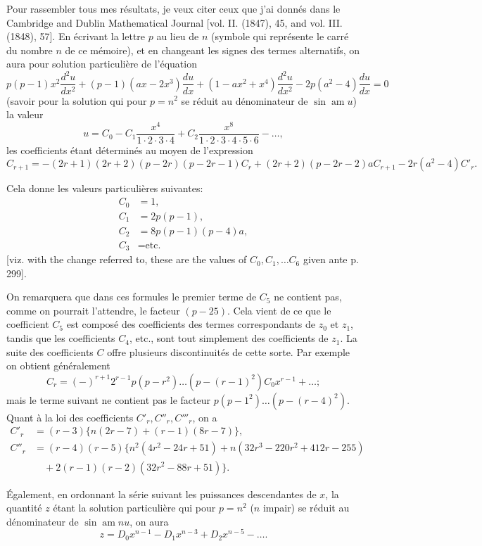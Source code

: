 \documentclass[11pt,a4paper]{book}
\begin{document}
Pour rassembler tous mes r\'{e}sultats, je veux citer ceux que j'ai donn\'{e}s dans le Cambridge and Dublin Mathematical Journal [vol. II. (1847), 45, and vol. III. (1848), 57]. En \'{e}crivant la lettre $p$ au lieu de $n$ (symbole qui repr\'{e}sente le carr\'{e} du nombre $n$ de ce m\'{e}moire), et en changeant les signes des termes alternatifs, on aura pour solution particuli\`{e}re de l'\'{e}quation
\[
p(p-1)x^2 \frac{d^2 u}{dx^2} + (p-1)(ax - 2x^3)\frac{du}{dx} + (1 - ax^2 + x^4)\frac{d^2 u}{dx^2} - 2p(a^2 - 4)\frac{du}{dx} = 0
\]
(savoir pour la solution qui pour $p = n^2$ se r\'{e}duit au d\'{e}nominateur de $\sin \operatorname{am} u$) la valeur
\[
u = C_0 - C_1 \frac{x^4}{1 \cdot 2 \cdot 3 \cdot 4} + C_2 \frac{x^8}{1 \cdot 2 \cdot 3 \cdot 4 \cdot 5 \cdot 6} - \ldots,
\]
les coefficients \'{e}tant d\'{e}termin\'{e}s au moyen de l'expression
\[
C_{r+1} = -(2r+1)(2r+2)(p-2r)(p-2r-1)C_r + (2r+2)(p-2r-2)aC_{r+1} - 2r(a^2-4)C'_r.
\]

Cela donne les valeurs particuli\`{e}res suivantes:
\begin{align*}
C_0 &= 1, \\
C_1 &= 2p(p-1), \\
C_2 &= 8p(p-1)(p-4)a, \\
C_3 &= \text{etc.}
\end{align*}
[viz. with the change referred to, these are the values of $C_0, C_1, \ldots C_6$ given ante p. 299].

On remarquera que dans ces formules le premier terme de $C_5$ ne contient pas, comme on pourrait l'attendre, le facteur $(p-25)$. Cela vient de ce que le coefficient $C_5$ est compos\'{e} des coefficients des termes correspondants de $z_0$ et $z_1$, tandis que les coefficients $C_4$, etc., sont tout simplement des coefficients de $z_1$. La suite des coefficients $C$ offre plusieurs discontinuit\'{e}s de cette sorte. Par exemple on obtient g\'{e}n\'{e}ralement
\[
C_r = (-)^{r+1} 2^{r-1} p(p-r^2) \ldots (p-(r-1)^2) C_0 x^{r-1} + \ldots;
\]
mais le terme suivant ne contient pas le facteur $p(p-1^2) \ldots (p-(r-4)^2)$. Quant \`{a} la loi des coefficients $C'_r, C''_r, C'''_r$, on a
\begin{align*}
C'_r &= (r-3)\{n(2r-7) + (r-1)(8r-7)\}, \\
C''_r &= (r-4)(r-5)\{n^2(4r^2 - 24r + 51) + n(32r^3 - 220r^2 + 412r - 255) \\
&\quad + 2(r-1)(r-2)(32r^2 - 88r + 51)\}.
\end{align*}

\'{E}galement, en ordonnant la s\'{e}rie suivant les puissances descendantes de $x$, la quantit\'{e} $z$ \'{e}tant la solution particuli\`{e}re qui pour $p = n^2$ ($n$ impair) se r\'{e}duit au d\'{e}nominateur de $\sin \operatorname{am} nu$, on aura
\[
z = D_0 x^{n-1} - D_1 x^{n-3} + D_2 x^{n-5} - \ldots.
\]
\end{document}
